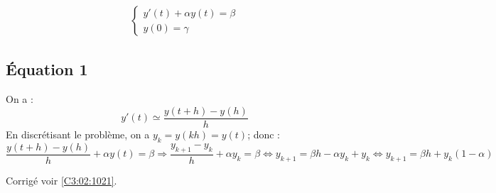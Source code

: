 \normaltrue \difficilefalse \tdifficilefalse
\correctionfalse


\setcounter{question}{0}
\ifcorrection
\else
{}
\fi


\begin{eqnarray}
\left\{
\begin{array}{l}
y'(t) + \alpha y(t) = \beta \\
y(0) = \gamma
\end{array}
\right.
\end{eqnarray}


\ifprof

\subsection*{Équation 1}
On a :
$$
y'(t) \simeq \dfrac{y(t+h)-y(h)}{h}
$$
En discrétisant le problème, on a $y_k=y(kh)=y(t)$; donc : 
$$
\dfrac{y(t+h)-y(h)}{h} + \alpha y(t) = \beta \Longrightarrow 
\dfrac{y_{k+1}-y_k}{h} + \alpha y_k = \beta \Longleftrightarrow 
y_{k+1}  = \beta h - \alpha y_k + y_k \Longleftrightarrow 
y_{k+1}  = \beta h + y_k\left(1 - \alpha \right) 
$$
\else
\fi



 

\ifprof
\else
\begin{flushright}
\footnotesize{Corrigé  voir \ref{C3:02:1021}.}
\end{flushright}%
\fi
